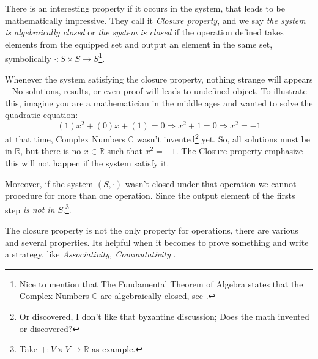 There is an interesting property if it occurs in the system, that leads to be mathematically impressive. They call it {\it Closure property}, and we say {\it the system is algebraically closed} or {\it the system is closed} if the operation defined takes elements from the equipped set and output an element in the same set, symbolically $\cdot: S\times S\longrightarrow S$\footnote{Nice to mention that The Fundamental Theorem of Algebra states that the Complex Numbers $\mathbb{C}$ are algebraically closed, see \cite{enwiki:1023272575}.}.

Whenever the system satisfying the closure property, nothing strange will appears -- No solutions, results, or even proof will leads to undefined object. To illustrate this, imagine you are a mathematician in the middle ages and wanted to solve the quadratic equation: $$(1)x^2+(0)x+(1)=0 \Longrightarrow x^{2}+1=0 \Longrightarrow x^{2}=-1$$ 
at that time, Complex Numbers $\mathbb{C}$ wasn't invented\footnote{Or discovered, I don't like that byzantine discussion; Does the math invented or discovered?} yet. So, all solutions must be in $\mathbb{R}$, but there is no $x \in \mathbb{R}$ such that $x^{2}=-1$. The Closure property emphasize this will not happen if the system satisfy it.

Moreover, if the system $(S,\cdot)$ wasn't closed under that operation we cannot procedure for more than one operation. Since the output element of the firsts step  {\it is not in $S$}.\footnote{Take $+:V\times V\longrightarrow \mathbb{R}$ as example.}. 

The closure property is not the only property for operations, there are various and several properties. Its helpful when it becomes to prove something and write a strategy, like {\it Associativity, Commutativity }.